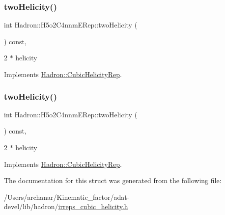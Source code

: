 \subsubsection{\texorpdfstring{twoHelicity()}{twoHelicity()}\hspace{0.1cm}{\footnotesize\ttfamily [2/3]}}
{\footnotesize\ttfamily int Hadron\+::\+H5o2\+C4nnm\+E\+Rep\+::two\+Helicity (\begin{DoxyParamCaption}{ }\end{DoxyParamCaption}) const\hspace{0.3cm}{\ttfamily [inline]}, {\ttfamily [virtual]}}

2 $\ast$ helicity 

Implements \mbox{\hyperlink{structHadron_1_1CubicHelicityRep_af507aa56fc2747eacc8cb6c96db31ecc}{Hadron\+::\+Cubic\+Helicity\+Rep}}.

\mbox{\label{structHadron_1_1H5o2C4nnmERep_a5b15b3ef270c38266d305dfec412684d}} 
\subsubsection{\texorpdfstring{twoHelicity()}{twoHelicity()}\hspace{0.1cm}{\footnotesize\ttfamily [3/3]}}
{\footnotesize\ttfamily int Hadron\+::\+H5o2\+C4nnm\+E\+Rep\+::two\+Helicity (\begin{DoxyParamCaption}{ }\end{DoxyParamCaption}) const\hspace{0.3cm}{\ttfamily [inline]}, {\ttfamily [virtual]}}

2 $\ast$ helicity 

Implements \mbox{\hyperlink{structHadron_1_1CubicHelicityRep_af507aa56fc2747eacc8cb6c96db31ecc}{Hadron\+::\+Cubic\+Helicity\+Rep}}.



The documentation for this struct was generated from the following file\+:\begin{DoxyCompactItemize}
\item 
/\+Users/archanar/\+Kinematic\+\_\+factor/adat-\/devel/lib/hadron/\mbox{\hyperlink{adat-devel_2lib_2hadron_2irreps__cubic__helicity_8h}{irreps\+\_\+cubic\+\_\+helicity.\+h}}\end{DoxyCompactItemize}
